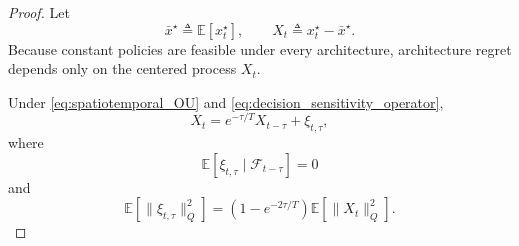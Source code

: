 \documentclass[11pt]{article}
\begin{document}
\begin{proof}
Let
\begin{equation}
    \bar{x}^\star
    \triangleq
    \mathbb{E}[x_t^\star],
    \qquad
    X_t
    \triangleq
    x_t^\star-\bar{x}^\star.
    \label{eq:centered_clairvoyant_action}
\end{equation}
Because constant policies are feasible under every architecture,
architecture regret depends only on the centered process $X_t$.

Under \eqref{eq:spatiotemporal_OU} and
\eqref{eq:decision_sensitivity_operator},
\begin{equation}
    X_t
    =
    e^{-\tau/T}X_{t-\tau}
    +
    \xi_{t,\tau},
    \label{eq:xstar_innovation_decomposition}
\end{equation}
where
\begin{equation}
    \mathbb{E}
    \left[
        \xi_{t,\tau}
        \mid
        \mathcal{F}_{t-\tau}
    \right]
    =
    0
    \label{eq:innovation_orthogonality}
\end{equation}
and
\begin{equation}
    \mathbb{E}
    \left[
        \|\xi_{t,\tau}\|_Q^2
    \right]
    =
    \left(
        1-e^{-2\tau/T}
    \right)
    \mathbb{E}
    \left[
        \|X_t\|_Q^2
    \right].
    \label{eq:innovation_variance}
\end{equation}


\end{proof}
\end{document}
